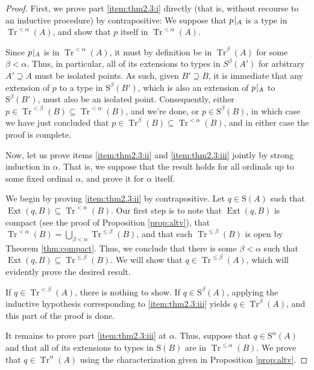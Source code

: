 \documentclass{article}
\theoremstyle{nonumberplain}
\newtheorem{proof}{Proof}
\newcommand{\Stone}{\mathrm{S}}
\DeclareMathOperator{\Tr}{Tr}
\DeclareMathOperator{\Ext}{Ext}
\newcommand{\rst}[2]{#1\mspace{1.3mu plus 0.5mu minus 0.5mu}|_{#2}}
\begin{document}
\begin{proof}
First, we prove part \ref{item:thm2.3:i} directly (that is, without recourse to an inductive procedure) by contrapositive: We suppose that $\rst p A$ is a type in $\Tr^{<\alpha}(A)$, and show that $p$ itself in $\Tr^{<\alpha}(A)$.

Since $\rst p A$ is in $\Tr^{<\alpha}(A)$, it must by definition be in $\Tr^\beta(A)$ for some $\beta < \alpha$. Thus, in particular, all of its extensions to types in $S^\beta(A')$ for arbitrary $A' \supseteq A$ must be isolated points. As such, given $B' \supseteq B$, it is immediate that any extension of $p$ to a type in $\Stone^\beta(B')$, which is also an extension of $\rst p A$ to $\Stone^\beta(B')$, must also be an isolated point. Consequently, either $p \in \Tr^{<\beta}(B) \subseteq \Tr^{<\alpha}(B)$, and we're done, or $p \in \Stone^\beta(B)$, in which case we have just concluded that $p \in \Tr^\beta(B) \subseteq \Tr^{<\alpha}(B)$, and in either case the proof is complete.

\smallskip

Now, let us prove items \ref{item:thm2.3:ii} and \ref{item:thm2.3:iii} jointly by strong induction in $\alpha$. That is, we suppose that the result holds for all ordinals up to some fixed ordinal $\alpha$, and prove it for $\alpha$ itself.

We begin by proving \ref{item:thm2.3:ii} by contrapositive. Let $q \in \Stone(A)$ such that $\Ext(q,B) \subseteq \Tr^{<\alpha}(B)$. Our first step is to note that $\Ext(q,B)$ is compact (see the proof of Proposition \ref{prop:altv}), that $\Tr^{<\alpha}(B) = \bigcup_{\beta < \alpha} \Tr^{\leq\beta}(B)$, and that each $\Tr^{\leq\beta}(B)$ is open by Theorem \ref{thm:compact}. Thus, we conclude that there is some $\beta < \alpha$ such that $\Ext(q,B) \subseteq \Tr^{\leq\beta}(B)$. We will show that $q \in \Tr^{\leq\beta}(A)$, which will evidently prove the desired result.

If $q \in \Tr^{<\beta}(A)$, there is nothing to show. If $q \in \Stone^\beta(A)$, applying the inductive hypothesis corresponding to \ref{item:thm2.3:iii} yields $q \in \Tr^\beta(A)$, and this part of the proof is done.

It remains to prove part \ref{item:thm2.3:iii} at $\alpha$. Thus, suppose that $q \in \Stone^\alpha(A)$ and that all of its extensions to types in $\Stone(B)$ are in $\Tr^{\leq \alpha}(B)$. We prove that $q \in \Tr^\alpha(A)$ using the characterization given in Proposition \ref{prop:altv}.


\end{proof}
\end{document}
